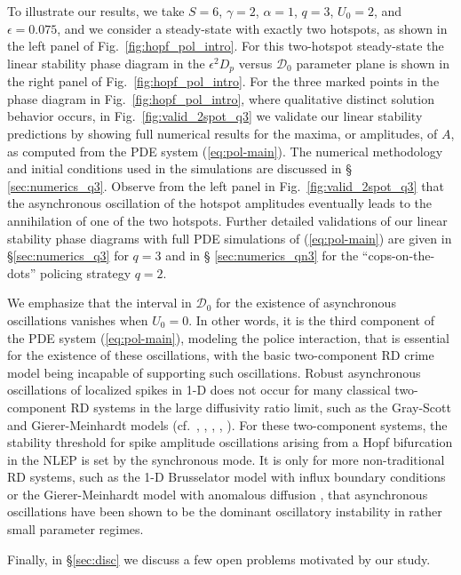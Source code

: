 \documentclass{article}%
\begin{document}
To illustrate our results, we take $S=6$, $\gamma=2$, $\alpha=1$,
$q=3$, $U_0=2$, and $\epsilon=0.075$, and we consider a steady-state
with exactly two hotspots, as shown in the left panel of
Fig.~\ref{fig:hopf_pol_intro}. For this two-hotspot steady-state the
linear stability phase diagram in the $\epsilon^2 D_p$ versus ${\mathcal D}_0$
parameter plane is shown in the right panel of
Fig.~\ref{fig:hopf_pol_intro}. For the three marked points in the
phase diagram in Fig.~\ref{fig:hopf_pol_intro}, where qualitative
distinct solution behavior occurs, in Fig.~\ref{fig:valid_2spot_q3} we
validate our linear stability predictions by showing full numerical
results for the maxima, or amplitudes, of $A$, as computed from the
PDE system (\ref{eq:pol-main}). The numerical methodology and initial
conditions used in the simulations are discussed in \S
\ref{sec:numerics_q3}. Observe from the left panel in
Fig.~\ref{fig:valid_2spot_q3} that the asynchronous oscillation of the
hotspot amplitudes eventually leads to the annihilation of one of the
two hotspots. Further detailed validations of our linear stability
phase diagrams with full PDE simulations of (\ref{eq:pol-main}) are
given in \S \ref{sec:numerics_q3} for $q=3$ and in \S
\ref{sec:numerics_qn3} for the ``cops-on-the-dots'' policing strategy
$q=2$.

We emphasize that the interval in ${\mathcal D}_0$ for the existence
of asynchronous oscillations vanishes when $U_0=0$. In other words, it
is the third component of the PDE system (\ref{eq:pol-main}), modeling
the police interaction, that is essential for the existence of these
oscillations, with the basic two-component RD crime model
\cite{kww_crime} being incapable of supporting such
oscillations. Robust asynchronous oscillations of localized spikes in
1-D does not occur for many classical two-component RD systems in the
large diffusivity ratio limit, such as the Gray-Scott and
Gierer-Meinhardt models (cf.~\cite{dgk_0}, \cite{iww},
\cite{floq-ref}, \cite{mjww_1}, \cite{kww_gs}). For these
two-component systems, the stability threshold for spike amplitude
oscillations arising from a Hopf bifurcation in the NLEP is set by the
synchronous mode. It is only for more non-traditional RD systems, such
as the 1-D Brusselator model with influx boundary conditions
\cite{tzou} or the Gierer-Meinhardt model with anomalous diffusion
\cite{nec_sub}, that asynchronous oscillations have been shown to be the
dominant oscillatory instability in rather small parameter regimes.

Finally, in \S \ref{sec:disc} we discuss a few open problems motivated
by our study.
\end{document}
